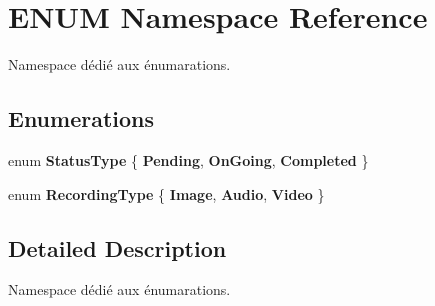 \hypertarget{namespace_e_n_u_m}{}\section{E\+N\+UM Namespace Reference}
\label{namespace_e_n_u_m}


Namespace dédié aux énumarations.  


\subsection*{Enumerations}
\begin{DoxyCompactItemize}
\item 
\mbox{\label{namespace_e_n_u_m_a048721c5d814c470a1064a422e357ae8}} 
enum {\bfseries Status\+Type} \{ {\bfseries Pending}, 
{\bfseries On\+Going}, 
{\bfseries Completed}
 \}
\item 
\mbox{\label{namespace_e_n_u_m_aa87d6a792637fd53ef4537eb4b34345d}} 
enum {\bfseries Recording\+Type} \{ {\bfseries Image}, 
{\bfseries Audio}, 
{\bfseries Video}
 \}
\end{DoxyCompactItemize}


\subsection{Detailed Description}
Namespace dédié aux énumarations. 